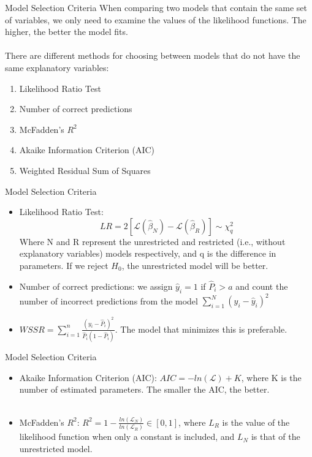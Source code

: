 \documentclass[notes,10pt, aspectratio=169]{beamer}
\begin{document}
\begin{frame}{Model Selection Criteria}
When comparing two models that contain the same set of variables, we only need to examine the values of the likelihood functions. The higher, the better the model fits.\\~\\
There are different methods for choosing between models that do not have the same explanatory variables:
\begin{enumerate}
    \item Likelihood Ratio Test
    \item Number of correct predictions
    \item McFadden's $R^2$
    \item Akaike Information Criterion (AIC)
    \item Weighted Residual Sum of Squares
\end{enumerate}
\end{frame}

\begin{frame}{Model Selection Criteria}
\begin{itemize}
    \item Likelihood Ratio Test:
    \[
    LR=2[\mathcal{L}(\hat{\beta}_N)-\mathcal{L}(\hat{\beta}_R)] \sim \chi_q^2
    \]
Where N and R represent the unrestricted and restricted (i.e., without explanatory variables) models respectively, and q is the difference in parameters. If we reject $H_0$, the unrestricted model will be better. \\[1em]

\item Number of correct predictions: we assign $\hat{y}_i=1$ if $\hat{P}_i>a$ and count the number of incorrect predictions from the model $\sum_{i=1}^N (y_i-\hat{y}_i)^2$\\[1em]
\item $WSSR=\sum_{i=1}^n \frac{(y_i-\hat{P}_i)^2}{\hat{P}_i(1-\hat{P}_i)}$. The model that minimizes this is preferable.
\end{itemize}
\end{frame}

\begin{frame}{Model Selection Criteria}
\begin{itemize}
    \item Akaike Information Criterion (AIC): $AIC=-ln(\mathcal{L})+K$, where K is the number of estimated parameters. The smaller the AIC, the better.\\~\\
    \item McFadden's $R^2$: $R^2=1-\frac{ln(\mathcal{L}_N)}{ln(\mathcal{L}_R)} \in [0,1]$, where $L_R$ is the value of the likelihood function when only a constant is included, and $L_N$ is that of the unrestricted model.
\end{itemize}
\end{frame}
\end{document}
